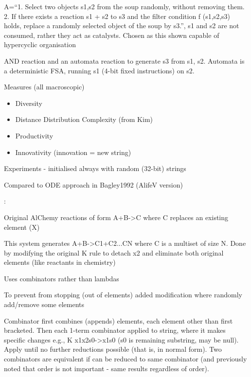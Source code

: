 A=``1. Select two objects s1,s2 from the soup randomly, without
removing them. 2. If there exists a reaction s1 + s2 to s3 and the
filter condition f (s1,s2,s3) holds, replace a randomly selected
object of the soup by s3.'', s1 and s2 are not consumed, rather they
act as catalysts. Chosen as this shown capable of hypercyclic
organisation

AND reaction and an automata reaction to generate s3 from s1, s2.
Automata is a deterministic FSA, running s1 (4-bit fixed instructions)
on s2.


Measures (all macroscopic)

\begin{itemize}
	\item
	
	Diversity
	
	\item
	
	Distance Distribution Complexity (from Kim)
	
	\item
	
	Productivity
	
	\item
	
	Innovativity (innovation = new string)
	
\end{itemize}


Experiments - initialised always with random (32-bit) strings

Compared to ODE approach in Bagley1992 (AlifeV version)

\autocite{Fenizio2000}:

Original AlChemy reactions of form A+B-\textgreater{}C where C replaces an existing element (X)

This system generates A+B-\textgreater{}C1+C2...CN where C is a multiset of size N. Done by modifying the original K rule to detach x2 and eliminate both original elements (like reactants in chemistry)

Uses combinators rather than lambdas

To prevent from stopping (out of elements) added modification where randomly add/remove some elements

Combinator first combines (appends) elements, each element other than first bracketed. Then each 1-term combinator applied to string, where it makes specific changes e.g., K x1x2s0-\textgreater{}x1s0 (s0 is remaining substring, may be null). Apply until no further reductions possible (that is, in normal form). Two combinators are equivalent if can be reduced to same combinator (and previously noted that order is not important - same results regardless of order).

